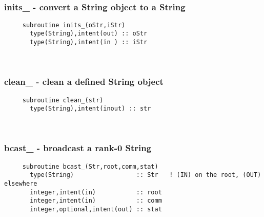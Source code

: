  
\mbox{}\hrulefill\ 
 

  \subsubsection{inits\_ - convert a String object to a String}

\begin{verbatim} 
     subroutine inits_(oStr,iStr)
       type(String),intent(out) :: oStr
       type(String),intent(in ) :: iStr
 \end{verbatim}%
 
 
\mbox{}\hrulefill\ 
 
  \subsubsection{clean\_ - clean a defined String object}

\begin{verbatim} 
     subroutine clean_(str)
       type(String),intent(inout) :: str
 \end{verbatim}%
 
 
\mbox{}\hrulefill\ 
 
  \subsubsection{bcast\_ - broadcast a rank-0 String}

\begin{verbatim} 
     subroutine bcast_(Str,root,comm,stat)
       type(String)                 :: Str   ! (IN) on the root, (OUT) elsewhere
       integer,intent(in)           :: root
       integer,intent(in)           :: comm
       integer,optional,intent(out) :: stat
 \end{verbatim}%
 
